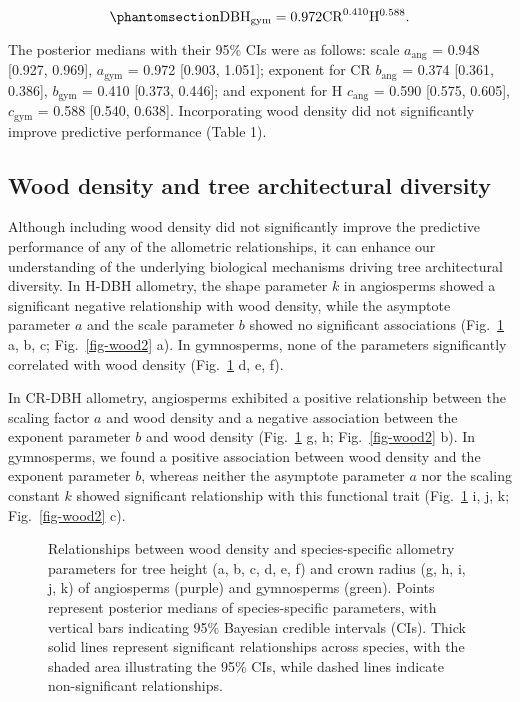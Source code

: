 \documentclass[
  12pt,
  letterpaper,
  DIV=11,
  numbers=noendperiod]{scrartcl}
\makeatletter
\newcommand*\pandocbounded[1]{%
  \sbox\pandoc@box{#1}%
  \Gscale@div\@tempa{\textheight}{\dimexpr\ht\pandoc@box+\dp\pandoc@box\relax}%
  \Gscale@div\@tempb{\linewidth}{\wd\pandoc@box}%
  \ifdim\@tempb\p@<\@tempa\p@\let\@tempa\@tempb\fi%
  \ifdim\@tempa\p@<\p@\scalebox{\@tempa}{\usebox\pandoc@box}%
  \else\usebox{\pandoc@box}%
  \fi%
}
\makeatother
\begin{document}
\begin{equation}\phantomsection\label{eq-dbh_gym}{
\mathrm{DBH_{gym}} = \mathrm{0.972}
\mathrm{CR}^{\text{0.410}}
\mathrm{H}^{\text{0.588}}.
}\end{equation}

The posterior medians with their 95\% CIs were as follows: scale
\(a_{\text{ang}}\) = 0.948 {[}0.927, 0.969{]}, \(a_{\text{gym}}\) =
0.972 {[}0.903, 1.051{]}; exponent for CR \(b_{\text{ang}}\) = 0.374
{[}0.361, 0.386{]}, \(b_{\text{gym}}\) = 0.410 {[}0.373, 0.446{]}; and
exponent for H \(c_{\text{ang}}\) = 0.590 {[}0.575, 0.605{]},
\(c_{\text{gym}}\) = 0.588 {[}0.540, 0.638{]}. Incorporating wood
density did not significantly improve predictive performance (Table 1).

\subsection{Wood density and tree architectural
diversity}\label{wood-density-and-tree-architectural-diversity}

Although including wood density did not significantly improve the
predictive performance of any of the allometric relationships, it can
enhance our understanding of the underlying biological mechanisms
driving tree architectural diversity. In H-DBH allometry, the shape
parameter \(k\) in angiosperms showed a significant negative
relationship with wood density, while the asymptote parameter \(a\) and
the scale parameter \(b\) showed no significant associations
(Fig.~\ref{fig-wood1} a, b, c; Fig.~\ref{fig-wood2} a). In gymnosperms,
none of the parameters significantly correlated with wood density
(Fig.~\ref{fig-wood1} d, e, f).

In CR-DBH allometry, angiosperms exhibited a positive relationship
between the scaling factor \(a\) and wood density and a negative
association between the exponent parameter \(b\) and wood density
(Fig.~\ref{fig-wood1} g, h; Fig.~\ref{fig-wood2} b). In gymnosperms, we
found a positive association between wood density and the exponent
parameter \(b\), whereas neither the asymptote parameter \(a\) nor the
scaling constant \(k\) showed significant relationship with this
functional trait (Fig.~\ref{fig-wood1} i, j, k; Fig.~\ref{fig-wood2} c).

\begin{figure}[H]

\centering{

\pandocbounded{\texttt{[image: ../figs/wd\_com.png]}}

}

\caption{\label{fig-wood1}Relationships between wood density and
species-specific allometry parameters for tree height (a, b, c, d, e, f)
and crown radius (g, h, i, j, k) of angiosperms (purple) and gymnosperms
(green). Points represent posterior medians of species-specific
parameters, with vertical bars indicating 95\% Bayesian credible
intervals (CIs). Thick solid lines represent significant relationships
across species, with the shaded area illustrating the 95\% CIs, while
dashed lines indicate non-significant relationships.}

\end{figure}%
\end{document}
